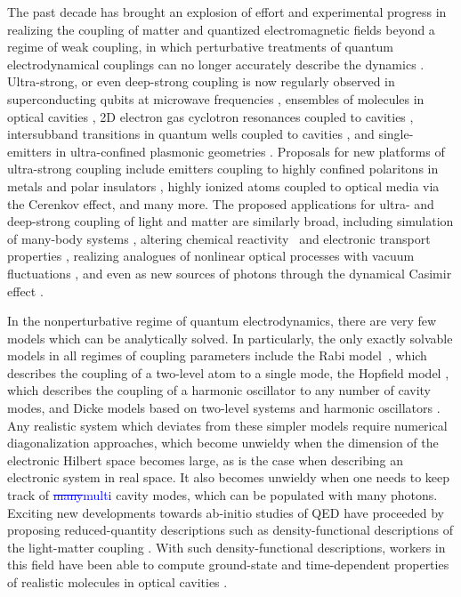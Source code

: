 \documentclass[aps,prb,twocolumn,
	groupedaddress,superscriptaddress,
	amsfonts,amssymb,amsmath,floatfix,
	citeautoscript]{revtex4-1}
\newcommand{\Jadd}[1]{\textcolor{blue}{#1}}
\newcommand{\Jrem}[1]{\textcolor{blue}{\sout{#1}}}
\begin{document}
The past decade has brought an explosion of effort and experimental progress in realizing the coupling of matter and quantized electromagnetic fields beyond a regime of weak coupling, in which perturbative treatments of quantum electrodynamical couplings can no longer accurately describe the dynamics \cite{flick7strong,ruggenthaler2017b,forn2018ultrastrong,kockum2018ultrastrong}. Ultra-strong, or even deep-strong coupling is now regularly observed in superconducting qubits at microwave frequencies \cite{blais2004,wallraff2004,yoshihara2017superconducting,forn2017ultrastrong}, ensembles of molecules in optical cavities \cite{hutchison2012,hutchison2013,coles2014,coles2014b,shalabney2015coherent, thomas2016,ebbesen2016}, 2D electron gas cyclotron resonances coupled to cavities \cite{hagenmuller2010ultrastrong,scalari2012ultrastrong,zhang2016collective}, intersubband transitions in quantum wells coupled to cavities \cite{todorov2010ultrastrong,geiser2012ultrastrong}, and single-emitters in ultra-confined plasmonic geometries \cite{benz2016,chikkaraddy2016}. Proposals for new platforms of ultra-strong coupling include emitters coupling to highly confined polaritons in metals and polar insulators \cite{rivera2016shrinking}, highly ionized atoms coupled to optical media via the Cerenkov effect, and many more. The proposed applications for ultra- and deep-strong coupling of light and matter are similarly broad, including simulation of many-body systems \cite{forn2018ultrastrong}, altering chemical reactivity~\cite{hutchison2012, thomas2016,flick2017} and electronic transport properties \cite{orgiu2015}, realizing analogues of nonlinear optical processes with vacuum fluctuations \cite{kockum2017deterministic}, and even as new sources of photons through the dynamical Casimir effect \cite{ciuti2005quantum}.

In the nonperturbative regime of quantum electrodynamics, there are very few models which can be analytically solved. In particularly, the only exactly solvable models in all regimes of coupling parameters include the Rabi model~\cite{braak2011}, which describes the coupling of a two-level atom to a single mode, the Hopfield model \cite{hopfield1958theory}, which describes the coupling of a harmonic oscillator to any number of cavity modes, and Dicke models based on two-level systems and harmonic oscillators \cite{dicke1954coherence}. Any realistic system which deviates from these simpler models require numerical diagonalization approaches, which become unwieldy when the dimension of the electronic Hilbert space becomes large, as is the case when describing an electronic system in real space. It also becomes unwieldy when one needs to keep track of \Jrem{many}\Jadd{multi} cavity modes, which can be populated with many photons. Exciting new developments towards ab-initio studies of QED have proceeded by proposing reduced-quantity descriptions such as density-functional descriptions of the light-matter coupling \cite{ruggenthaler2014,pellegrini2015,flick2015,dimitrov2017,flick2018,flick2018b,schaefer2018}. With such density-functional descriptions, workers in this field have been able to compute ground-state and time-dependent properties of realistic molecules in optical cavities \cite{flick2017c}. 
\end{document}
